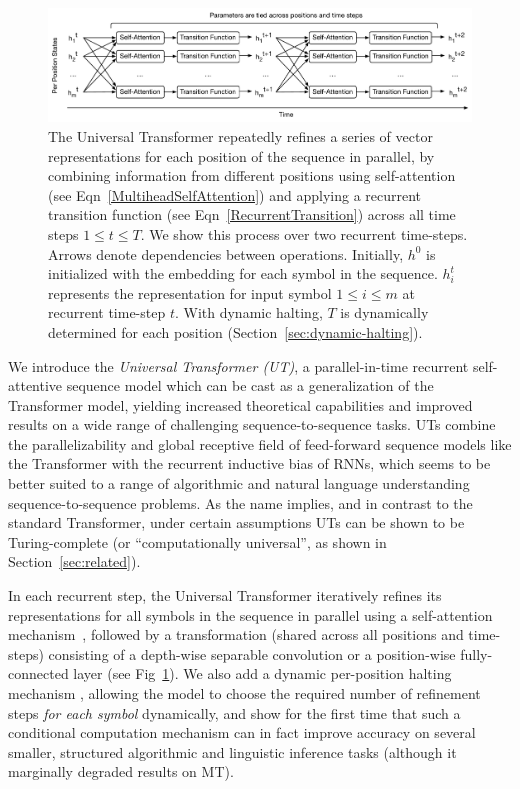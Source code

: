 \begin{figure}
 \centering
 \includegraphics[width=\textwidth]{04-part-03/chapter-06/figs_and_tables/fig_universal-transformer-as-rnn.pdf}
 \caption{The Universal Transformer repeatedly refines a series of vector representations for each position of the sequence in parallel, by combining information from different positions using self-attention (see Eqn~\ref{MultiheadSelfAttention}) and applying a recurrent transition function (see Eqn~\ref{RecurrentTransition}) across all time steps $1 \leq t \leq T$. We show this process over two recurrent time-steps. Arrows denote dependencies between operations. Initially, $h^0$ is initialized with the embedding for each symbol in the sequence. $h^t_i$ represents the representation for input symbol $1 \leq i \leq m$ at recurrent time-step $t$. With dynamic halting, $T$ is dynamically determined for each position (Section~\ref{sec:dynamic-halting}).}
 \label{fig:rec-state}
\end{figure}


We introduce the \emph{Universal Transformer (UT)}, a parallel-in-time recurrent self-attentive sequence model which can be cast as a generalization of the Transformer model, yielding increased theoretical capabilities and improved results on a wide range of challenging sequence-to-sequence tasks. UTs combine the parallelizability and global receptive field of feed-forward sequence models like the Transformer with the recurrent inductive bias of RNNs, which seems to be better suited to a range of algorithmic and natural language understanding sequence-to-sequence problems. As the name implies, and in contrast to the standard Transformer, under certain assumptions UTs can be shown to be Turing-complete (or ``computationally universal'', as shown in Section~\ref{sec:related}).

In each recurrent step, the Universal Transformer iteratively refines its representations for all symbols in the sequence in parallel using a self-attention mechanism~\citep{decomposableAttnModel,lin2017structured}, followed by a transformation (shared across all positions and time-steps) consisting of a depth-wise separable convolution \citep{xception2016,slicenet} or a position-wise fully-connected layer (see Fig~\ref{fig:rec-state}). We also add a dynamic per-position halting mechanism \citep{graves2016adaptive}, allowing the model to choose the required number of refinement steps \emph{for each symbol} dynamically, and show for the first time that such a conditional computation mechanism can in fact improve accuracy on several smaller, structured algorithmic and linguistic inference tasks (although it marginally degraded results on MT). 

